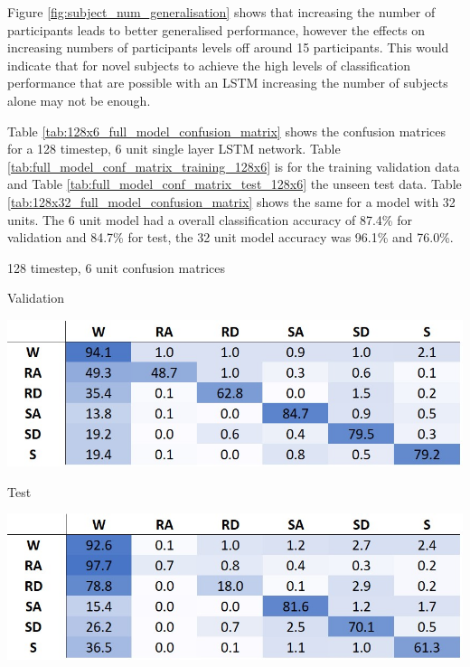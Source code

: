 \documentclass[sensors,article,submit,moreauthors,pdftex]{Definitions/mdpi}
\begin{document}
Figure \ref{fig:subject_num_generalisation} shows that increasing the number of participants leads to better generalised performance, however the effects on increasing numbers of participants levels off around 15 participants. This would indicate that for novel subjects to achieve the high levels of classification performance that are possible with an LSTM increasing the number of subjects alone may not be enough.

Table \ref{tab:128x6_full_model_confusion_matrix} shows the confusion matrices for a 128 timestep, 6 unit single layer LSTM network. Table \ref{tab:full_model_conf_matrix_training_128x6} is for the training validation data and Table \ref{tab:full_model_conf_matrix_test_128x6} the unseen test data. Table \ref{tab:128x32_full_model_confusion_matrix} shows the same for a model with 32 units. The 6 unit model had a overall classification accuracy of 87.4\% for validation and 84.7\% for test, the 32 unit model accuracy was 96.1\% and 76.0\%.

\begin{table}[!hbt]
    \centering
    \caption{128 timestep, 6 unit confusion matrices}
    \label{tab:128x6_full_model_confusion_matrix}
    \begin{subtable}{.45\textwidth}
        \centering
        \caption{Validation}
        \label{tab:full_model_conf_matrix_training_128x6}
        \includegraphics[width=\textwidth]{Figures/results/conf_matricies/Training_128x6_NT.jpg}
    \end{subtable}
    \hfil
    \begin{subtable}{.45\textwidth}
        \centering
        \caption{Test}
        \label{tab:full_model_conf_matrix_test_128x6}
        \includegraphics[width=\textwidth]{Figures/results/conf_matricies/Test_128x6_NT.jpg}
    \end{subtable}
\end{table}
\end{document}

